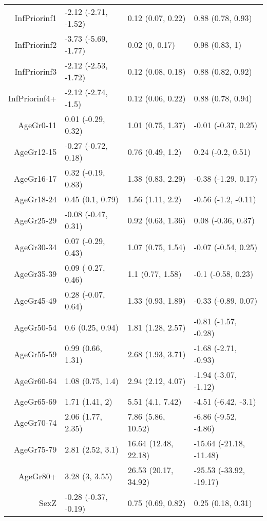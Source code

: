 \begin{table}[ht]
\begin{tabular}{rlll}
  InfPriorinf1 & -2.12 (-2.71, -1.52) & 0.12 (0.07, 0.22) & 0.88 (0.78, 0.93) \\ 
  InfPriorinf2 & -3.73 (-5.69, -1.77) & 0.02 (0, 0.17) & 0.98 (0.83, 1) \\ 
  InfPriorinf3 & -2.12 (-2.53, -1.72) & 0.12 (0.08, 0.18) & 0.88 (0.82, 0.92) \\ 
  InfPriorinf4+ & -2.12 (-2.74, -1.5) & 0.12 (0.06, 0.22) & 0.88 (0.78, 0.94) \\ 
  AgeGr0-11 & 0.01 (-0.29, 0.32) & 1.01 (0.75, 1.37) & -0.01 (-0.37, 0.25) \\ 
  AgeGr12-15 & -0.27 (-0.72, 0.18) & 0.76 (0.49, 1.2) & 0.24 (-0.2, 0.51) \\ 
  AgeGr16-17 & 0.32 (-0.19, 0.83) & 1.38 (0.83, 2.29) & -0.38 (-1.29, 0.17) \\ 
  AgeGr18-24 & 0.45 (0.1, 0.79) & 1.56 (1.11, 2.2) & -0.56 (-1.2, -0.11) \\ 
  AgeGr25-29 & -0.08 (-0.47, 0.31) & 0.92 (0.63, 1.36) & 0.08 (-0.36, 0.37) \\ 
  AgeGr30-34 & 0.07 (-0.29, 0.43) & 1.07 (0.75, 1.54) & -0.07 (-0.54, 0.25) \\ 
  AgeGr35-39 & 0.09 (-0.27, 0.46) & 1.1 (0.77, 1.58) & -0.1 (-0.58, 0.23) \\ 
  AgeGr45-49 & 0.28 (-0.07, 0.64) & 1.33 (0.93, 1.89) & -0.33 (-0.89, 0.07) \\ 
  AgeGr50-54 & 0.6 (0.25, 0.94) & 1.81 (1.28, 2.57) & -0.81 (-1.57, -0.28) \\ 
  AgeGr55-59 & 0.99 (0.66, 1.31) & 2.68 (1.93, 3.71) & -1.68 (-2.71, -0.93) \\ 
  AgeGr60-64 & 1.08 (0.75, 1.4) & 2.94 (2.12, 4.07) & -1.94 (-3.07, -1.12) \\ 
  AgeGr65-69 & 1.71 (1.41, 2) & 5.51 (4.1, 7.42) & -4.51 (-6.42, -3.1) \\ 
  AgeGr70-74 & 2.06 (1.77, 2.35) & 7.86 (5.86, 10.52) & -6.86 (-9.52, -4.86) \\ 
  AgeGr75-79 & 2.81 (2.52, 3.1) & 16.64 (12.48, 22.18) & -15.64 (-21.18, -11.48) \\ 
  AgeGr80+ & 3.28 (3, 3.55) & 26.53 (20.17, 34.92) & -25.53 (-33.92, -19.17) \\ 
  SexZ & -0.28 (-0.37, -0.19) & 0.75 (0.69, 0.82) & 0.25 (0.18, 0.31) \\ 
   \hline
\end{tabular}
\end{table}
